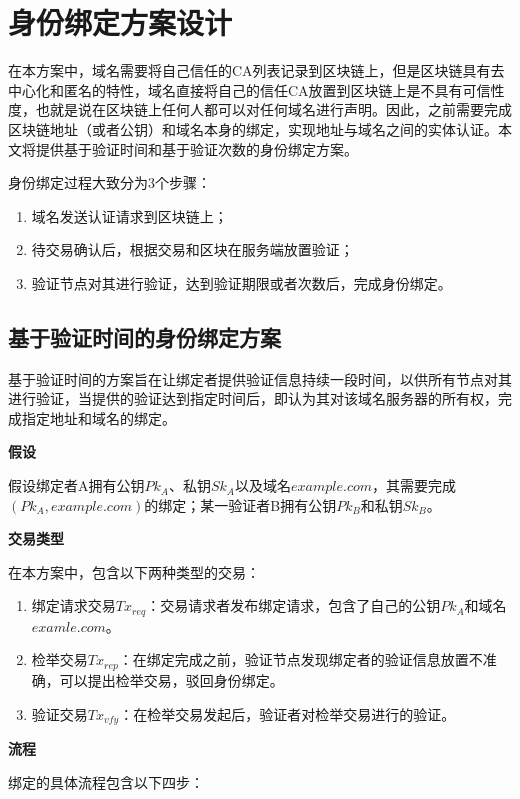 \section{身份绑定方案设计}

在本方案中，域名需要将自己信任的CA列表记录到区块链上，但是区块链具有去中心化和匿名的特性，域名直接将自己的信任CA放置到区块链上是不具有可信性度，也就是说在区块链上任何人都可以对任何域名进行声明。因此，之前需要完成区块链地址（或者公钥）和域名本身的绑定，实现地址与域名之间的实体认证。本文将提供基于验证时间和基于验证次数的身份绑定方案。

身份绑定过程大致分为3个步骤：

\begin{enumerate}
	\item 域名发送认证请求到区块链上；
	\item 待交易确认后，根据交易和区块在服务端放置验证；
	\item 验证节点对其进行验证，达到验证期限或者次数后，完成身份绑定。
\end{enumerate}

\subsection{基于验证时间的身份绑定方案}

基于验证时间的方案旨在让绑定者提供验证信息持续一段时间，以供所有节点对其进行验证，当提供的验证达到指定时间后，即认为其对该域名服务器的所有权，完成指定地址和域名的绑定。


\noindent\textbf{假设}

假设绑定者A拥有公钥$Pk_A$、私钥$Sk_A$以及域名$example.com$，其需要完成$(Pk_A, example.com)$的绑定；某一验证者B拥有公钥$Pk_B$和私钥$Sk_B$。

\noindent\textbf{交易类型}

在本方案中，包含以下两种类型的交易：

\begin{enumerate}
	\item 绑定请求交易$Tx_{req}$：交易请求者发布绑定请求，包含了自己的公钥$Pk_A$和域名$examle.com$。
	\item 检举交易$Tx_{rep}$：在绑定完成之前，验证节点发现绑定者的验证信息放置不准确，可以提出检举交易，驳回身份绑定。
	\item 验证交易$Tx_{vfy}$：在检举交易发起后，验证者对检举交易进行的验证。
\end{enumerate}

\noindent\textbf{流程}

绑定的具体流程包含以下四步：

